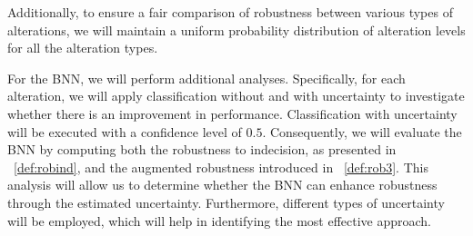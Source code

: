 Additionally, to ensure a fair comparison of robustness between various types of alterations, we will maintain a uniform probability distribution of alteration levels for all the alteration types.

For the BNN, we will perform additional analyses. Specifically, for each alteration, we will apply classification without and with uncertainty to investigate whether there is an improvement in performance. Classification with uncertainty will be executed with a confidence level of $0.5$. Consequently, we will evaluate the BNN by computing both the robustness to indecision, as presented in \Def~\ref{def:robind}, and the augmented robustness introduced in \Def~\ref{def:rob3}. This analysis will allow us to determine whether the BNN can enhance robustness through the estimated uncertainty. Furthermore, different types of uncertainty will be employed, which will help in identifying the most effective approach.
